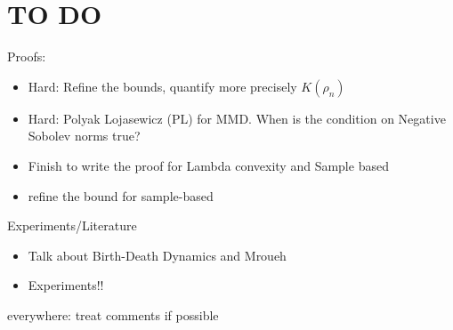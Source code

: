 
\section*{TO DO}

Proofs:
\begin{itemize}
	\item Hard: Refine the bounds, quantify more precisely $K(\rho_n)$
	\item Hard: Polyak Lojasewicz (PL) for MMD. When is the condition on Negative Sobolev norms true?
	\item Finish to write the proof for Lambda convexity and Sample based
	\item refine the bound for sample-based
\end{itemize}


Experiments/Literature
\begin{itemize}
	\item Talk about Birth-Death Dynamics and Mroueh
	\item Experiments!!
\end{itemize}
everywhere: treat comments if possible
